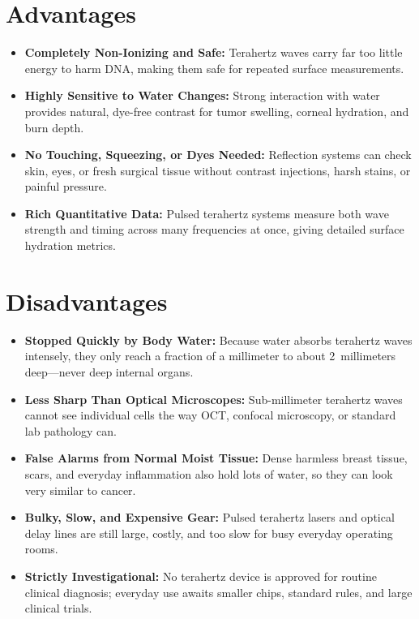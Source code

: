 \section{Advantages}
\begin{itemize}
  \item \textbf{Completely Non-Ionizing and Safe:} Terahertz waves carry far too little energy to harm DNA, making them safe for repeated surface measurements.
  \item \textbf{Highly Sensitive to Water Changes:} Strong interaction with water provides natural, dye-free contrast for tumor swelling, corneal hydration, and burn depth.
  \item \textbf{No Touching, Squeezing, or Dyes Needed:} Reflection systems can check skin, eyes, or fresh surgical tissue without contrast injections, harsh stains, or painful pressure.
  \item \textbf{Rich Quantitative Data:} Pulsed terahertz systems measure both wave strength and timing across many frequencies at once, giving detailed surface hydration metrics.
\end{itemize}

\section{Disadvantages}
\begin{itemize}
  \item \textbf{Stopped Quickly by Body Water:} Because water absorbs terahertz waves intensely, they only reach a fraction of a millimeter to about 2~millimeters deep---never deep internal organs.
  \item \textbf{Less Sharp Than Optical Microscopes:} Sub-millimeter terahertz waves cannot see individual cells the way OCT, confocal microscopy, or standard lab pathology can.
  \item \textbf{False Alarms from Normal Moist Tissue:} Dense harmless breast tissue, scars, and everyday inflammation also hold lots of water, so they can look very similar to cancer.
  \item \textbf{Bulky, Slow, and Expensive Gear:} Pulsed terahertz lasers and optical delay lines are still large, costly, and too slow for busy everyday operating rooms.
  \item \textbf{Strictly Investigational:} No terahertz device is approved for routine clinical diagnosis; everyday use awaits smaller chips, standard rules, and large clinical trials.
\end{itemize}

